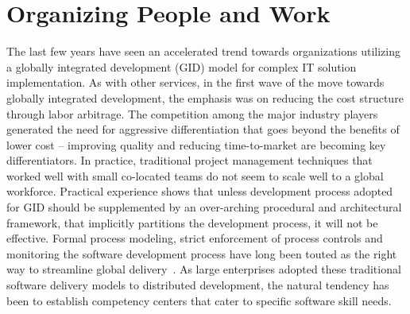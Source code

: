 \section{Organizing People and Work}


The last few years have seen an accelerated trend towards organizations utilizing a globally integrated development (GID) model for complex IT solution implementation. As with other services, in the first wave of the move towards globally integrated development, the emphasis was on reducing the cost structure through labor arbitrage.  The competition among the major industry players generated the need for aggressive differentiation that goes beyond the benefits of lower cost -- improving quality and reducing time-to-market are becoming key differentiators. In practice, traditional project management techniques that worked well with small co-located teams do not seem to scale well to a global workforce. Practical experience shows that unless development process adopted for GID should be supplemented by an over-arching procedural and architectural framework, that implicitly partitions the development process, it will not be effective. Formal process modeling, strict enforcement of process controls and monitoring the software development process have long been touted as the right way to streamline global delivery~\cite{glo32}. As large enterprises adopted these traditional software delivery models  to distributed development, the natural tendency has been to establish competency centers that cater to specific software skill needs.

